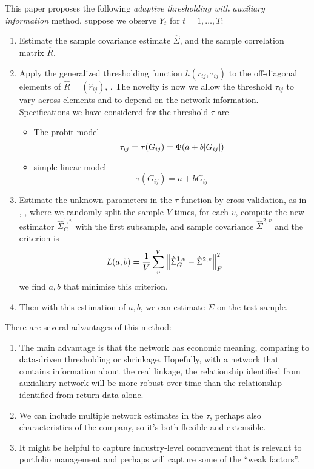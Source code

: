 This paper proposes the following \textit{adaptive thresholding with auxiliary information} method, suppose we observe \(Y_{t}\) for \(t = 1 ,\dots, T\):
\begin{enumerate}
    \item Estimate the sample covariance estimate \(\hat{\Sigma}\), and the sample correlation matrix \(\hat{R}\). 
    \item Apply the generalized thresholding function \(h(r_{ij},\tau_{ij})\) to the off-diagonal elements of \(\hat{R} = (\hat{r}_{ij})\), \cite{rothman2009GeneralizedThresholding}. The novelty is now we allow the threshold \(\tau_{ij}\) to vary across elements and to depend on the network information.  Specifications we have considered for the threshold \(\tau\) are 
    \begin{itemize}
        \item 
        The probit model
            \begin{equation*}
            \tau_{ij} = \tau\pqty{G_{ij}} = \Phi\pqty{a + b \abs{G_{ij}}}
            \end{equation*}
        \item simple linear model 
            \begin{equation*}
                \tau(G_{ij}) = a + bG_{ij}
            \end{equation*}
    \end{itemize}
    \item Estimate the unknown parameters in the \(\tau\) function by cross validation, as in \cite{bickel2008CovarianceRegularization}, \cite{cai2011AdaptiveThresholding}, where we randomly split the sample \(V\) times, for each \(v\), compute the new estimator \(\hat{\Sigma}^{1,v}_{G}\) with the first subsample, and sample covariance \(\hat{\Sigma}^{2,v}\) and the criterion is 
    \begin{equation*}
        L(a, b) = \frac{1}{V} \sum_{v}^{V} \norm{\hat{\Sigma}^{1,v}_{G} - \hat{\Sigma}^{2,v}}^{2}_{F}
    \end{equation*}
    we find \(a,b\) that minimise this criterion. 
    
    \item Then with this estimation of \(a,b\), we can estimate \(\Sigma\) on the test sample. 
\end{enumerate}

There are several advantages of this method:
\begin{enumerate}
    \item The main advantage is that the network has economic meaning, comparing to data-driven thresholding or shrinkage. Hopefully, with a network that contains information about the real linkage, the relationship identified from auxialiary network will be more robust over time than the relationship identified from return data alone. 
    \item We can include multiple network estimates in the \(\tau\), perhaps also characteristics of the company, so it's both flexible and extensible.
    \item It might be helpful to capture industry-level comovement that is relevant to portfolio management and perhaps will capture some of the ``weak factors''.
\end{enumerate}

